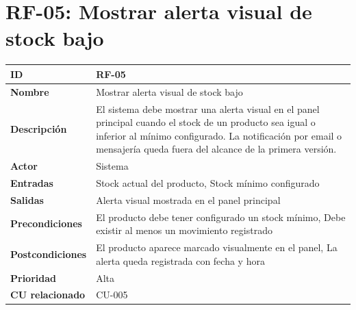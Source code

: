 \documentclass{article}
\begin{document}
\section*{RF-05: Mostrar alerta visual de stock bajo}
\begin{center}
\renewcommand{\arraystretch}{1.4}
\begin{tabular}{|L{4cm}|L{12cm}|}
\hline
\textbf{ID} & RF-05 \\
\hline
\textbf{Nombre} & Mostrar alerta visual de stock bajo \\
\hline
\textbf{Descripción} & El sistema debe mostrar una alerta visual en el panel principal cuando el stock de un producto sea igual o inferior al mínimo configurado. La notificación por email o mensajería queda fuera del alcance de la primera versión. \\
\hline
\textbf{Actor} & Sistema \\
\hline
\textbf{Entradas} & Stock actual del producto, Stock mínimo configurado \\
\hline
\textbf{Salidas} & Alerta visual mostrada en el panel principal \\
\hline
\textbf{Precondiciones} & El producto debe tener configurado un stock mínimo, Debe existir al menos un movimiento registrado \\
\hline
\textbf{Postcondiciones} & El producto aparece marcado visualmente en el panel, La alerta queda registrada con fecha y hora \\
\hline
\textbf{Prioridad} & Alta \\
\hline
\textbf{CU relacionado} & CU-005 \\
\hline
\end{tabular}
\end{center}
\end{document}
